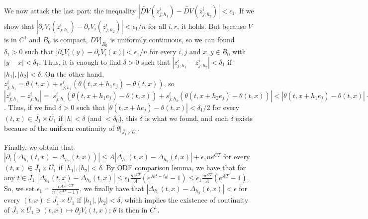 \documentclass{article}
\begin{document}
We now attack the last part: the inequality $|\tilde{DV}(z^i_{j;h_1}) - \tilde{DV}(z^i_{j;h_2})| < \epsilon_1$.
If we show that $|\partial_r V_i(z^i_{j;h_1}) - \partial_r V_i(z^i_{j;h_2})| < \epsilon_1 / n$ for all $i, r$, it holds.
But because $V$ is in $C^1$ and $B_0$ is compact, $DV|_{B_0}$ is uniformly continuous, so we can found $\delta_1 > 0$ such that $|\partial_r V_i(y) - \partial_r V_i(x)| < \epsilon_1 / n$ for every $i, j$ and $x, y \in B_0$ with $|y - x| < \delta_1$.
Thus, it is enough to find $\delta > 0$ such that $|z^i_{j;h_1} - z^i_{j;h_2}| < \delta_1$ if $|h_1|, |h_2| < \delta$.
On the other hand, $z^i_{j;h_1} = \theta(t, x) + s^i_{j;h_1} (\theta(t, x + h_1 e_j) - \theta(t, x))$, so $|z^i_{j;h_1} - z^i_{j;h_2}| = |s^i_{j;h_1} (\theta(t, x + h_1 e_j) - \theta(t, x)) + s^i_{j;h_2} (\theta(t, x + h_2 e_j) - \theta(t, x))| < |\theta(t, x + h_1 e_j) - \theta(t, x)| + |\theta(t, x + h_2 e_j) - \theta(t, x)|$.
Thus, if we find $\delta > 0$ such that $|\theta(t, x + h e_j) - \theta(t, x)| < \delta_1 / 2$ for every $(t, x) \in \overline{J_1} \times \overline{U_1}$ if $|h| < \delta$ (and $< \delta_0$), this $\delta$ is what we found, and such $\delta$ exists because of the uniform continuity of $\theta|_{\overline{J_1} \times \overline{U_1}}$.

Finally, we obtain that $|\partial_t(\Delta_{h_1}(t, x) - \Delta_{h_2}(t, x))| \le A |\Delta_{h_1}(t, x) - \Delta_{h_2}(t, x)| + \epsilon_1 ne^{CT}$ for every $(t, x) \in \overline{J_1} \times \overline{U_1}$ if $|h_1|, |h_2| < \delta$.
By ODE comparison lemma, we have that for any $t \in \overline{J_1}$ $|\Delta_{h_1}(t, x) - \Delta_{h_2}(t, x)| \le \epsilon_1 \frac{ne^{CT}}{A} (e^{A|t - t_0|} - 1) \le \epsilon_1 \frac{ne^{CT}}{A} (e^{AT} - 1)$.
So, we set $\epsilon_1 = \frac{\epsilon Ae^{-CT}}{n(e^{AT} - 1)}$, we finally have that $|\Delta_{h_1}(t, x) - \Delta_{h_2}(t, x)| < \epsilon$ for every $(t, x) \in \overline{J_1} \times \overline{U_1}$ if $|h_1|, |h_2| < \delta$, which implies the existence of continuity of $\overline{J_1} \times \overline{U_1} \ni (t, x) \mapsto \partial_j V_i(t, x)$; $\theta$ is then in $C^1$.
\end{document}

